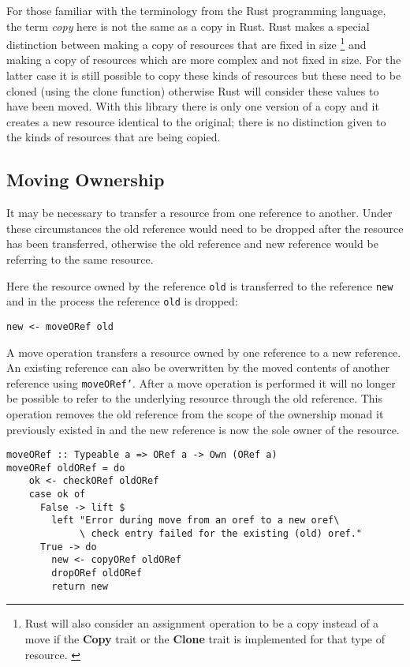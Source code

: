 \documentclass[onehalf,11pt]{beavtex}
\begin{document}
For those familiar with the terminology from the Rust programming language, the
term \textit{copy} here is not the same as a copy in Rust. Rust makes a special
distinction between making a copy of resources that are fixed in size
\footnote{Rust will also consider an assignment operation to be a copy instead
  of a move if the \textbf{Copy} trait or the \textbf{Clone} trait is
  implemented for that type of resource. \cite{rust_book_traits}
  \cite{rust_docs_clone_trait}}
and making a copy of resources which are more complex and not fixed in size.
For the latter case it is still possible to copy these kinds of resources but these
need to be cloned (using the clone function) otherwise Rust will consider these
values to have been moved. \cite{rust_book_ownership}
With this library there is only one version of a copy and it creates a new
resource identical to the original; there is no distinction given to the kinds
of resources that are being copied.

\subsection{Moving Ownership}

It may be necessary to transfer a resource from one reference to another.
Under these circumstances the old reference would need to be dropped after
the resource has been transferred, otherwise the old reference and new
reference would be referring to the same resource.

Here the resource owned by the reference \texttt{old} is
transferred to the reference \texttt{new} and in the process the
reference \texttt{old} is dropped:

\begin{verbatim}
new <- moveORef old
\end{verbatim}

A move operation transfers a resource owned by one reference to a new reference.
An existing reference can also be overwritten by the moved contents of another
reference using \texttt{moveORef'}.
After a move operation is performed it will no longer be possible to refer to the
underlying resource through the old reference.
This operation removes the old reference from the scope of the ownership monad it
previously existed in and the new reference is now the sole owner of the resource.

\begin{verbatim}
moveORef :: Typeable a => ORef a -> Own (ORef a)
moveORef oldORef = do
    ok <- checkORef oldORef
    case ok of
      False -> lift $
        left "Error during move from an oref to a new oref\
             \ check entry failed for the existing (old) oref."
      True -> do
        new <- copyORef oldORef
        dropORef oldORef
        return new
\end{verbatim}
\end{document}
